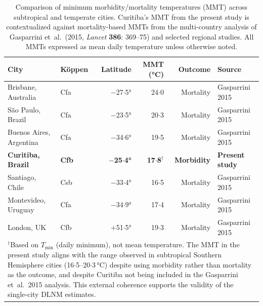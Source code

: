 \documentclass[12pt]{article}
\begin{document}
\begin{table}[ht]
\centering
\caption{Comparison of minimum morbidity/mortality temperatures (MMT)
across subtropical and temperate cities. Curitiba's MMT from the
present study is contextualized against mortality-based MMTs from the
multi-country analysis of Gasparrini et~al.\ (2015, \textit{Lancet}
\textbf{386}: 369--75) and selected regional studies. All MMTs
expressed as mean daily temperature unless otherwise noted.}
\label{etab:mmt_comparison}
\begin{tabular}{llrrrl}
\toprule
City & K\"{o}ppen & Latitude & MMT (°C) & Outcome & Source \\
\midrule
Brisbane, Australia & Cfa & $-$27${\cdot}$5° & 24${\cdot}$0 & Mortality & Gasparrini 2015 \\
S\~{a}o Paulo, Brazil & Cfa & $-$23${\cdot}$5° & 20${\cdot}$3 & Mortality & Gasparrini 2015 \\
Buenos Aires, Argentina & Cfa & $-$34${\cdot}$6° & 19${\cdot}$5 & Mortality & Gasparrini 2015 \\
\textbf{Curitiba, Brazil} & \textbf{Cfb} & $-$\textbf{25${\cdot}$4°} &
  \textbf{17${\cdot}$8}$^{\dagger}$ & \textbf{Morbidity} & \textbf{Present study} \\
Santiago, Chile & Csb & $-$33${\cdot}$4° & 16${\cdot}$5 & Mortality & Gasparrini 2015 \\
Montevideo, Uruguay & Cfa & $-$34${\cdot}$9° & 17${\cdot}$4 & Mortality & Gasparrini 2015 \\
London, UK & Cfb & $+$51${\cdot}$5° & 19${\cdot}$3 & Mortality & Gasparrini 2015 \\
\bottomrule
\multicolumn{6}{p{0.95\textwidth}}{\footnotesize
$^{\dagger}$Based on $T_\mathrm{min}$ (daily minimum), not mean
temperature. The MMT in the present study aligns with the range
observed in subtropical Southern Hemisphere cities (16${\cdot}$5--20${\cdot}$3\,°C)
despite using morbidity rather than mortality as the outcome, and
despite Curitiba not being included in the Gasparrini et~al.\ 2015
analysis. This external coherence supports the validity of the
single-city DLNM estimates.}
\end{tabular}
\end{table}
\end{document}
